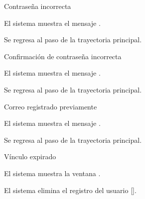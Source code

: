 {\begin{trayectoriaAlternativa}
  \end{trayectoriaAlternativa}

  \begin{trayectoriaAlternativa}
    {Contraseña incorrecta}

    \item El sistema muestra el mensaje
      .

    \item Se regresa al paso  de la trayectoria
      principal.

  \end{trayectoriaAlternativa}

  \begin{trayectoriaAlternativa}
    {Confirmación de contraseña incorrecta}

    \item El sistema muestra el mensaje
      .

    \item Se regresa al paso  de la trayectoria
      principal.

  \end{trayectoriaAlternativa}

  \begin{trayectoriaAlternativa}
    {Correo registrado previamente}

    \item El sistema muestra el mensaje
      .

    \item Se regresa al paso  de la trayectoria
      principal.

  \end{trayectoriaAlternativa}

  \begin{trayectoriaAlternativa}
    {Vínculo expirado}

    \item El sistema muestra la ventana
      .

    \item El sistema elimina el registro del usuario
      [].

  \end{trayectoriaAlternativa}
}
